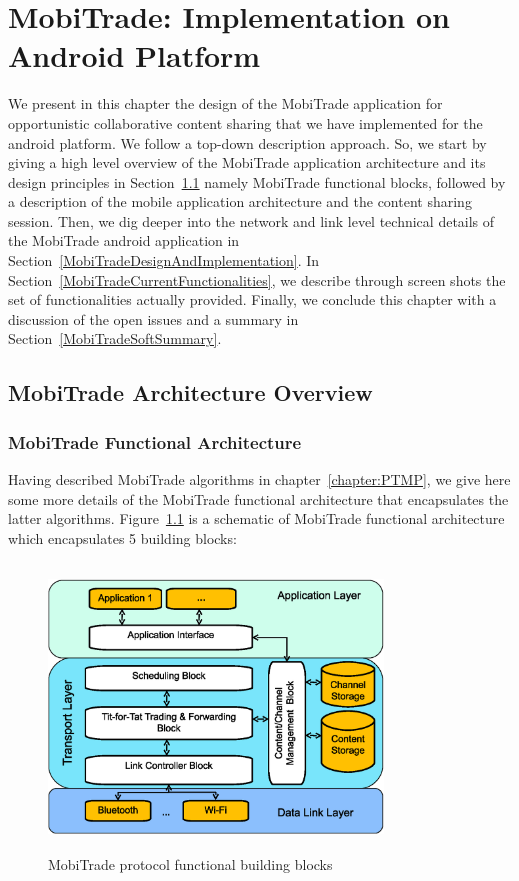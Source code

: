 \chapter{MobiTrade: Implementation on Android Platform}
\label{chapter:MobiTrade}
\minitoc

We present in this chapter the design of the MobiTrade application for opportunistic collaborative content sharing that we have implemented for the android platform. We follow a top-down description approach. So, we start by giving a high level overview of the MobiTrade application architecture and its design principles in Section~\ref{MobiTradeArchitecture} namely MobiTrade functional blocks, followed by a description of the mobile application architecture and the content sharing session. Then, we dig deeper into the network and link level technical details of the MobiTrade android application in Section~\ref{MobiTradeDesignAndImplementation}. In Section~\ref{MobiTradeCurrentFunctionalities}, we describe through screen shots the set of functionalities actually provided. Finally, we conclude this chapter with a discussion of the open issues and a summary in Section~\ref{MobiTradeSoftSummary}.

\section{MobiTrade Architecture Overview}
\label{MobiTradeArchitecture}

\subsection{MobiTrade Functional Architecture}
\label{MobiTrade-functional-architecture}

Having described MobiTrade algorithms in chapter~\ref{chapter:PTMP}, we give here some more details of the MobiTrade functional architecture that encapsulates the latter algorithms. Figure~\ref{MobiTrade-node-architecture} is a schematic of MobiTrade functional architecture which encapsulates 5 building blocks:

\begin{figure}[!h]
\centering
\includegraphics[width=3.5in,height=3in]{Chapitre6/MobiTrade_Node.eps}
\vspace{-0.1in}
\caption{MobiTrade protocol functional building blocks}
\label{MobiTrade-node-architecture}
\vspace{-0.1in}
\end{figure}

